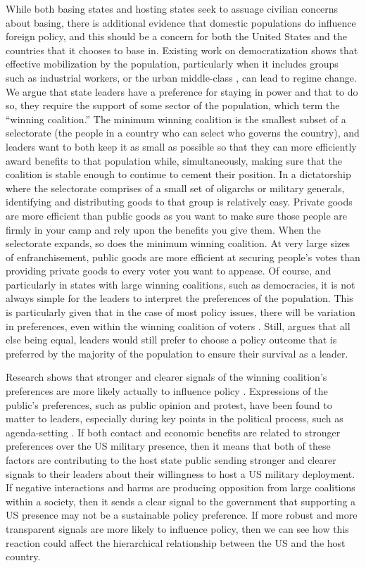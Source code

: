 {	While both basing states and hosting states seek to assuage civilian concerns about basing, there is additional evidence that domestic populations do influence foreign policy, and this should be a concern for both the United States and the countries that it chooses to base in. Existing work on democratization shows that effective mobilization by the population, particularly when it includes groups such as industrial workers, or the urban middle-class \cite{Dahlum2019}, can lead to regime change. We argue that state leaders have a preference for staying in power and that to do so, they require the support of some sector of the population, which  term the ``winning coalition.'' The minimum winning coalition is the smallest subset of a selectorate (the people in a country who can select who governs the country), and leaders want to both keep it as small as possible so that they can more efficiently award benefits to that population while, simultaneously, making sure that the coalition is stable enough to continue to cement their position. In a dictatorship where the selectorate comprises of a small set of oligarchs or military generals, identifying and distributing goods to that group is relatively easy. Private goods are more efficient than public goods as you want to make sure those people are firmly in your camp and rely upon the benefits you give them. When the selectorate expands, so does the minimum winning coalition. At very large sizes of enfranchisement, public goods are more efficient at securing people's votes than providing private goods to every voter you want to appease. Of course, and particularly in states with large winning coalitions, such as democracies, it is not always simple for the leaders to interpret the preferences of the population. This is particularly given that in the case of most policy issues, there will be variation in preferences, even within the winning coalition of voters \cite{Lohmann1993}. Still,  argues that all else being equal, leaders would still prefer to choose a policy outcome that is preferred by the majority of the population to ensure their survival as a leader. 
	
	Research shows that stronger and clearer signals of the winning coalition's preferences are more likely actually to influence policy \cite{Fassiotto2017}. Expressions of the public's preferences, such as public opinion and protest, have been found to matter to leaders, especially during key points in the political process, such as agenda-setting \cite{Baumgartner2015}. If both contact and economic benefits are related to stronger preferences over the US military presence, then it means that both of these factors are contributing to the host state public sending stronger and clearer signals to their leaders about their willingness to host a US military deployment. If negative interactions and harms are producing opposition from large coalitions within a society, then it sends a clear signal to the government that supporting a US presence may not be a sustainable policy preference. If more robust and more transparent signals are more likely to influence policy, then we can see how this reaction could affect the hierarchical relationship between the US and the host country. 
	
}
